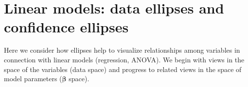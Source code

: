 \documentclass[11pt]{article}%
\newcommand*{\todo}[1]{\marginpar{ToDo:\small{#1}}}
\renewcommand*{\vec}[1]{\ensuremath{\bm{#1}}}
\begin{document}







\section{Linear models: data ellipses and confidence ellipses}

Here we consider how ellipses help to visualize relationships among variables
in connection with linear models (regression, ANOVA).
We begin with views in the space of the variables (data space)
and progress to related views in the space of model parameters
($\vec{\beta}$ space).























\end{document}
